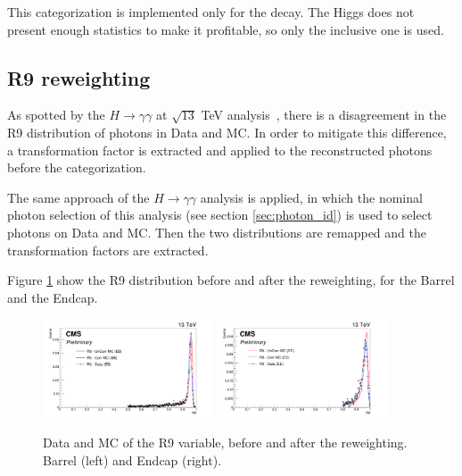 This categorization is implemented only for the \Z decay. The Higgs does not present enough statistics to make it profitable, so only the inclusive one is used. 

\subsection{R9 reweighting}

As spotted by the $H \rightarrow \gamma\gamma$ at $\sqrt{13}$ TeV analysis~\cite{higgs_gammagamma_PAPPER}, there is a disagreement in the R9 distribution of photons in Data and MC. In order to mitigate this difference, a transformation factor is extracted and applied to the reconstructed photons before the categorization.

The same approach of the $H \rightarrow \gamma\gamma$ analysis is applied, in which the nominal photon selection of this analysis (see section \ref{sec:photon_id}) is used to select photons on Data and MC. Then the two distributions are remapped and the transformation factors are extracted. 

Figure \ref{fig:r9_reweighting} show the R9 distribution before and after the reweighting, for the Barrel and the Endcap.


\begin{figure}[!htbp]
\begin{center}
\includegraphics[width=0.45\textwidth]{figures/R9/R9EB.png}\hspace*{1.cm}
\includegraphics[width=0.45\textwidth]{figures/R9/R9EE.png}
\end{center}\vspace*{-.5cm}
\caption{Data and MC of the R9 variable, before and after the reweighting. Barrel (left) and Endcap (right).}
\label{fig:r9_reweighting}
\end{figure}

